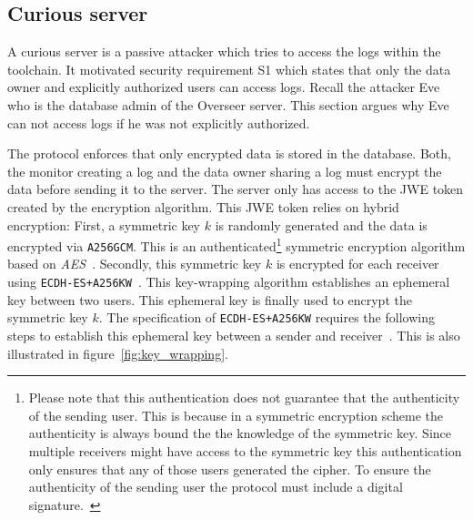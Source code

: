 \documentclass[../main.tex]{subfiles}
\begin{document}
\subsection{Curious server}
A curious server is a passive attacker which tries to access the logs within the toolchain.
It motivated security requirement S1 which states that only the data owner and explicitly authorized users can access logs.
Recall the attacker Eve who is the database admin of the Overseer server.
This section argues why Eve can not access logs if he was not explicitly authorized.

The protocol enforces that only encrypted data is stored in the database.
Both, the monitor creating a log and the data owner sharing a log must encrypt the data before sending it to the server.
The server only has access to the JWE token created by the encryption algorithm.
This JWE token relies on hybrid encryption:
First, a symmetric key $k$ is randomly generated and the data is encrypted via \verb|A256GCM|.
This is an authenticated\footnote{Please note that this authentication does not guarantee that the authenticity of the sending user. This is because in a symmetric encryption scheme the authenticity is always bound the the knowledge of the symmetric key. Since multiple receivers might have access to the symmetric key this authentication only ensures that any of those users generated the cipher. To ensure the authenticity of the sending user the protocol must include a digital signature.~\cite[315]{Eckert2018}} symmetric encryption algorithm based on \emph{AES}~\cite{Jones2015}.
Secondly, this symmetric key $k$ is encrypted for each receiver using \verb|ECDH-ES+A256KW|~\cite{Jones2015}.
This key-wrapping algorithm establishes an ephemeral key between two users.
This ephemeral key is finally used to encrypt the symmetric key $k$.
The specification of \verb|ECDH-ES+A256KW| requires the following steps to establish this ephemeral key between a sender and receiver~\cite[100]{Barker2017}.
This is also illustrated in figure~\ref{fig:key_wrapping}.
\end{document}
